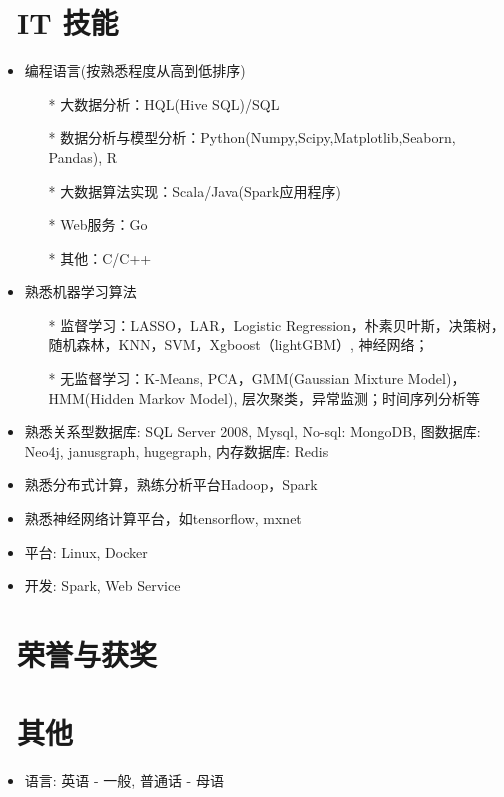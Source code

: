 \documentclass{resume}
\begin{document}
\section{\faCogs\ IT 技能}
\begin{itemize}[parsep=0.5ex]
   \item 编程语言(按熟悉程度从高到低排序)
     \begin{itemize}
      \item[*] 大数据分析：HQL(Hive SQL)/SQL
      \item[*] 数据分析与模型分析：Python(Numpy,Scipy,Matplotlib,Seaborn, Pandas), R
      \item[*] 大数据算法实现：Scala/Java(Spark应用程序)
      \item[*] Web服务：Go
      \item[*] 其他：C/C++      
     \end{itemize}		     
  \item 熟悉机器学习算法
  \begin{itemize}
  \item[*] 监督学习：LASSO，LAR，Logistic Regression，朴素贝叶斯，决策树，随机森林，KNN，SVM，Xgboost（lightGBM）, 神经网络；
  \item[*] 无监督学习：K-Means, PCA，GMM(Gaussian Mixture Model)，HMM(Hidden Markov Model), 层次聚类，异常监测；时间序列分析等
  \end{itemize}
  \item 熟悉关系型数据库: SQL Server 2008, Mysql, No-sql: MongoDB, 图数据库: Neo4j, janusgraph, hugegraph, 内存数据库: Redis	  
  \item 熟悉分布式计算，熟练分析平台Hadoop，Spark
  \item 熟悉神经网络计算平台，如tensorflow, mxnet	  
  \item 平台: Linux, Docker
  \item 开发: Spark, Web Service
\end{itemize}

\section{\faHeartO\ 荣誉与获奖}
\section{\faInfo\ 其他}
\begin{itemize}[parsep=0.5ex]
  \item 语言: 英语 - 一般, 普通话 - 母语
\end{itemize}

%
%
\end{document}
